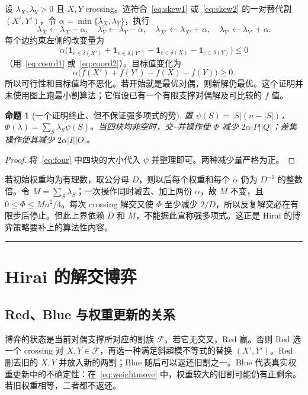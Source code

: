 \documentclass[UTF8,11pt,a4paper]{ctexart}
\newtheorem{proposition}[definition]{命题}
\newcommand{\cut}{\delta}
\newcommand{\calF}{\mathcal F}
\newcommand{\progressrule}{\par\medskip\noindent\rule{\linewidth}{0.65pt}\par\medskip}
\begin{document}
设 $\lambda_X,\lambda_Y>0$ 且 $X,Y$ crossing。选符合~\eqref{eq:skew1} 或~\eqref{eq:skew2} 的一对替代割 $(X',Y')$，令 $\alpha=\min\{\lambda_X,\lambda_Y\}$，执行
\begin{equation}\label{eq:weightmove}
\lambda_X\gets\lambda_X-\alpha,\quad
\lambda_Y\gets\lambda_Y-\alpha,\quad
\lambda_{X'}\gets\lambda_{X'}+\alpha,\quad
\lambda_{Y'}\gets\lambda_{Y'}+\alpha.
\end{equation}
每个边约束左侧的改变量为
\[
\alpha\bigl(\mathbf1_{e\in\cut(X')}+\mathbf1_{e\in\cut(Y')}
-\mathbf1_{e\in\cut(X)}-\mathbf1_{e\in\cut(Y)}\bigr)\le0
\]
（用~\eqref{eq:coord1} 或~\eqref{eq:coord2}）。目标值变化为
\[
\alpha\bigl(f(X')+f(Y')-f(X)-f(Y)\bigr)\ge0.
\]
所以可行性和目标值均不恶化。若开始就是最优对偶，则新解仍最优。这个证明并未使用图上跑最小割算法；它假设已有一个有限支撑对偶解及可比较的 $f$ 值。

\begin{proposition}[一个证明终止、但不保证强多项式的势]
置 $\psi(S)=|S|(n-|S|)$，$\Phi(\lambda)=\sum_S\lambda_S\psi(S)$。当四块均非空时，交--并操作使 $\Phi$ 减少 $2\alpha|P||Q|$；差集操作使其减少 $2\alpha|I||O|$。
\end{proposition}
\begin{proof}
将~\eqref{eq:four} 中四块的大小代入 $\psi$ 并整理即可。两种减少量严格为正。
\end{proof}
若初始权重均为有理数，取公分母 $D$，则以后每个权重和每个 $\alpha$ 仍为 $D^{-1}$ 的整数倍。令 $M=\sum_S\lambda_S$；一次操作同时减去、加上两份 $\alpha$，故 $M$ 不变，且 $0\le\Phi\le Mn^2/4$。每次 crossing 解交又使 $\Phi$ 至少减少 $2/D$，所以反复解交必在有限步后停止。但此上界依赖 $D$ 和 $M$，不能据此宣称强多项式。这正是 Hirai 的博弈策略要补上的算法性内容。

\progressrule
\section{Hirai 的解交博弈}

\subsection{Red、Blue 与权重更新的关系}

博弈的状态是当前对偶支撑所对应的割族 $\calF$。若它无交叉，Red 赢。否则 Red 选一个 crossing 对 $X,Y\in\calF$，再选一种满足斜超模不等式的替换 $(X',Y')$。Red 删去旧的 $X,Y$ 并放入新的两割；Blue 随后可以返还旧割之一。Blue 代表真实权重更新中的不确定性：在~\eqref{eq:weightmove} 中，权重较大的旧割可能仍有正剩余。若旧权重相等，二者都不返还。
\end{document}
